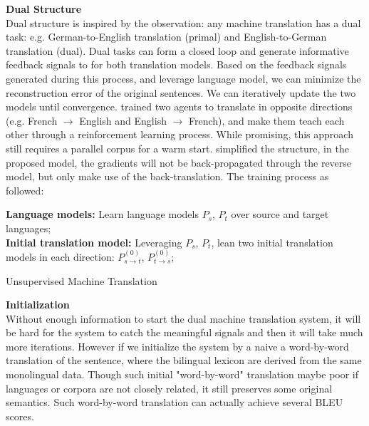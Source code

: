 \textbf{Dual Structure}\\
Dual structure is inspired by the observation: any machine translation has a dual task: e.g. German-to-English translation (primal) and English-to-German translation (dual). Dual tasks can form a closed loop and generate informative  feedback signals to for both translation models. Based on the feedback signals generated during this process, and leverage language model, we can minimize the reconstruction error of the original sentences. We can iteratively update the two models until convergence.   \cite{he2016dual} trained two agents to translate in opposite directions (e.g. French $\rightarrow$ English and English $\rightarrow$ French), and make them teach each other through a reinforcement learning process. While promising, this approach still requires a parallel corpus for a warm start. \cite{lample2018phrase} simplified the structure, in the proposed model, the gradients will not be back-propagated through the reverse model, but only make use of the back-translation. The training process as followed:\\

\begin{algorithm}[H]
	\SetAlgoLined
	\textbf{Language models:} Learn language models $P_s$, $P_t$ over source and target languages;\\
	\textbf{Initial translation model:}  Leveraging $P_s$, $P_t$, lean two initial translation models in each direction: $P_{s\rightarrow t}^{(0)}$, ${P_{t \rightarrow s}^{(0)}}$;\\
	\caption{Unsupervised Machine Translation}
\end{algorithm}


\textbf{Initialization}\\
Without enough information to start the dual machine translation system, it will be hard for the system to catch the meaningful signals and then it will take much more iterations. However if we initialize the system by a naive a word-by-word translation of the sentence, where the bilingual lexicon are derived from the same monolingual data. Though such initial "word-by-word" translation maybe poor if languages or corpora are not closely related, it still preserves some  original semantics. Such word-by-word translation can actually achieve several BLEU scores.\\



